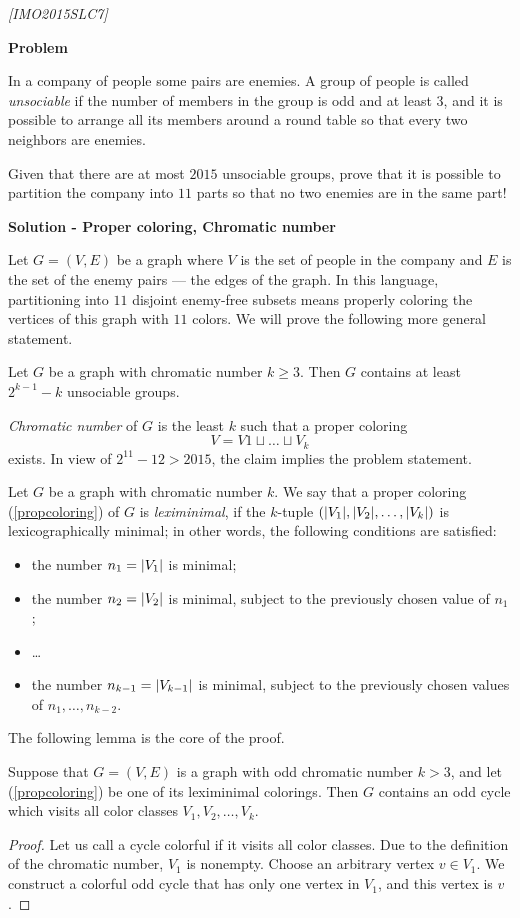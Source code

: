 \begin{problem}
\textit{[IMO2015SLC7]}

\textbf{Problem}


In a company of people some pairs are enemies. A group of people is called \textit{unsociable} if the number of members in the group is odd and at least $3$, and it is possible to arrange all its members around a round table so that every two neighbors are enemies. 

Given that there are at most $2015$ unsociable groups, prove that it is possible to partition the company into $11$ parts so that no two enemies are in the same part!

\textbf{Solution - Proper coloring, Chromatic number}

Let $G = (V, E)$ be a graph where $V$ is the set of people in the company and $E$ is the set of the enemy pairs — the edges of the graph. In this language, partitioning into $11$ disjoint enemy-free subsets means properly coloring the vertices of this graph with $11$ colors. We will prove the following more general statement.

\begin{claim} Let $G$ be a graph with chromatic number $k \geq  3$. Then $G$ contains at least $2^{k-1} - k$ unsociable groups.
\end{claim}

\textit{Chromatic number} of $G$ is the least $k$ such that a proper coloring 
\begin{equation}
\label{propcoloring}
V = V1 \sqcup \dots \sqcup V_k
\end{equation}
exists. In view of $2^{11} - 12 > 2015$, the claim implies the problem statement. 

Let $G$ be a graph with chromatic number $k$. We say that a proper coloring (\ref{propcoloring}) of $G$ is \textit{leximinimal}, if the $k$-tuple $(\lvert V_1\rvert, \lvert V_2\rvert, \dots , \lvert V_k\rvert)$ is lexicographically minimal; in other words, the following conditions are satisfied: 
\begin{itemize}
\item the number $n_1 = \lvert V_1\rvert$ is minimal; 
\item the number $n_2 = \lvert V_2\rvert$ is
minimal, subject to the previously chosen value of $n_1$; 
\item \dots  
\item the number $n_{k-1}  = \lvert V_{k-1}\rvert$ is minimal,
subject to the previously chosen values of $n_1, \dots , n_{k-2}$.
\end{itemize}
The following lemma is the core of the proof.
\begin{lemma}
\label{leximinlemma} 
Suppose that $G = (V, E)$ is a graph with odd chromatic number $k > 3$, and let (\ref{propcoloring}) be one of its leximinimal colorings. Then $G$ contains an odd cycle which visits all color classes
$V_1, V_2, \dots, V_k$.
\end{lemma}
\begin{proof}
Let us call a cycle colorful if it visits all color classes. Due to the definition of the chromatic number, $V_1$ is nonempty. Choose an arbitrary vertex $v \in V_1$. We construct a colorful odd cycle that has only one vertex in $V_1$, and this vertex is $v$. 


\end{proof}
\end{problem}
